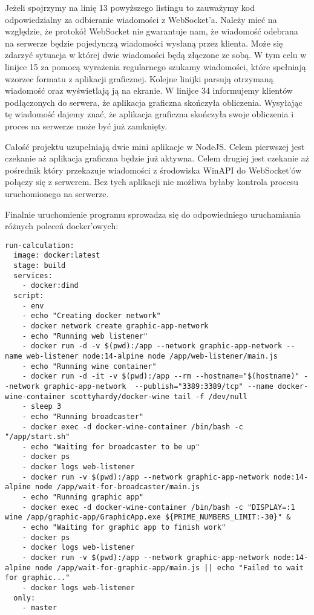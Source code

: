 Jeżeli spojrzymy na linię 13 powyższego listingu to zauważymy kod odpowiedzialny za odbieranie wiadomości z WebSocket'a. Należy mieć na względzie, że protokół WebSocket nie gwarantuje nam, że wiadomość odebrana na serwerze będzie pojedynczą wiadomości wysłaną przez klienta. Może się zdarzyć sytuacja w której dwie wiadomości będą złączone ze sobą. W tym celu w linijce 15 za pomocą wyrażenia regularnego szukamy wiadomości, które spełniają wzorzec formatu z aplikacji graficznej. Kolejne linijki parsują otrzymaną wiadomość oraz wyświetlają ją na ekranie. W linijce 34 informujemy klientów podłączonych do serwera, że aplikacja graficzna skończyła obliczenia. Wysyłając tę wiadomość dajemy znać, że aplikacja graficzna skończyła swoje obliczenia i proces na serwerze może być już zamknięty.
\par
Całość projektu uzupełniają dwie mini aplikacje w NodeJS. Celem pierwszej jest czekanie aż aplikacja graficzna będzie już aktywna. Celem drugiej jest czekanie aż pośrednik który przekazuje wiadomości z środowiska WinAPI do WebSocket'ów połączy się z serwerem. Bez tych aplikacji nie możliwa byłaby kontrola procesu uruchomionego na serwerze.
\par
Finalnie uruchomienie programu sprowadza się do odpowiedniego uruchamiania różnych poleceń docker'owych:
\begin{lstlisting}[caption={.gitlab-ci.yml - konfiguracji procesu automatyzującego}]
run-calculation:
  image: docker:latest
  stage: build
  services:
    - docker:dind
  script:
    - env
    - echo "Creating docker network"
    - docker network create graphic-app-network
    - echo "Running web listener"
    - docker run -d -v $(pwd):/app --network graphic-app-network --name web-listener node:14-alpine node /app/web-listener/main.js
    - echo "Running wine container"
    - docker run -d -it -v $(pwd):/app --rm --hostname="$(hostname)" --network graphic-app-network  --publish="3389:3389/tcp" --name docker-wine-container scottyhardy/docker-wine tail -f /dev/null
    - sleep 3
    - echo "Running broadcaster"
    - docker exec -d docker-wine-container /bin/bash -c "/app/start.sh"
    - echo "Waiting for broadcaster to be up"
    - docker ps
    - docker logs web-listener
    - docker run -v $(pwd):/app --network graphic-app-network node:14-alpine node /app/wait-for-broadcaster/main.js
    - echo "Running graphic app"
    - docker exec -d docker-wine-container /bin/bash -c "DISPLAY=:1 wine /app/graphic-app/GraphicApp.exe ${PRIME_NUMBERS_LIMIT:-30}" &
    - echo "Waiting for graphic app to finish work"
    - docker ps
    - docker logs web-listener
    - docker run -v $(pwd):/app --network graphic-app-network node:14-alpine node /app/wait-for-graphic-app/main.js || echo "Failed to wait for graphic..."
    - docker logs web-listener
  only:
    - master
\end{lstlisting}
